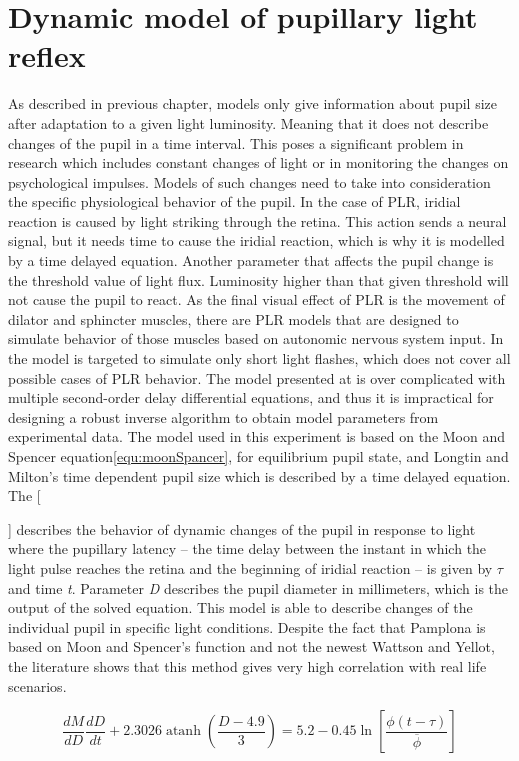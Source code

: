 \documentclass[USenglish,twocolumn]{article}
\newcommand{\Ref}[2]{%
    \IfEqCase{#1}{%
	    {fig}{Figure~\ref{#2}}%
	    {tab}{Table~\ref{#2}}%
	    {equ}{Equation~\ref{#2}}%
    }[\PackageError{tree}{Undefined option to tree: #1}{}]%
}%
\begin{document}
\section{Dynamic model of pupillary light reflex}
As described in previous chapter, models only give information about pupil size after adaptation to a given light luminosity. Meaning that it does not describe changes of the pupil in a time interval. This poses a significant problem in research which includes constant changes of light or in monitoring the changes on psychological impulses. Models of such changes need to take into consideration the specific physiological behavior of the pupil.
In the case of PLR, iridial reaction is caused by light striking through the retina. This action sends a neural signal, but it needs time to cause the iridial reaction, which is why it is modelled by a time delayed equation. Another parameter that affects the pupil change is the threshold value of light flux. Luminosity higher than that given threshold will not cause the pupil to react. 
As the final visual effect of PLR is the movement of dilator and sphincter muscles, there are PLR models that are designed to simulate behavior of those muscles based on autonomic nervous system input. In \cite{Fan} the model is targeted to simulate only short light flashes, which does not cover all possible cases of PLR behavior. The model presented at \cite{Suaste-Gomez} is over complicated with multiple second-order delay differential equations, and thus it is impractical for designing a robust inverse algorithm to obtain model parameters from experimental data.
The model used in this experiment is based on the Moon and Spencer equation\ref{equ:moonSpancer}, for equilibrium pupil state, and Longtin and Milton’s time dependent pupil size which is described by a time delayed equation. The \Ref{equ}{equ:Pampelona} describes the behavior of dynamic changes of the pupil in response to light where the pupillary latency – the time delay between the instant in which the light pulse reaches the retina and the beginning of iridial reaction – is given by $\tau$ and time \textit{t}. Parameter \textit{D} describes the pupil diameter in millimeters, which is the output of the solved equation.  
This model is able to describe changes of the individual pupil in specific light conditions. Despite the fact that Pamplona is based on Moon and Spencer’s function and not the newest Wattson and Yellot, the literature shows that this method gives very high correlation with real life scenarios.

\begin{equation}
\label{equ:Pampelona}
\frac { d M } { d D } \frac { d D } { d t } + 2.3026 \operatorname { atanh } \left( \frac { D - 4.9 } { 3 } \right) = 5.2 - 0.45 \ln \left[ \frac { \phi ( t - \tau ) } { \overline { \phi } } \right]
\end{equation}
\end{document}
